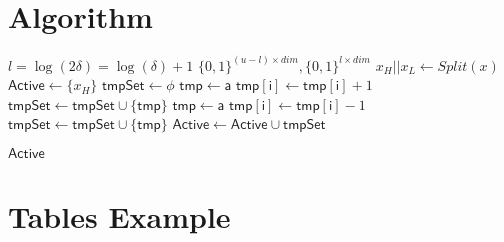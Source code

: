 \newpage
\section{Algorithm}

\label{app:alg}
\begin{algorithm}[!t]
\caption{$GenActive$}\label{alg:cap}
\begin{algorithmic}[1]
\State $l = \log(2\delta) = \log(\delta)+1$
\State \Return $\{0,1\}^{(u-l)\times dim}, \{0,1\}^{l \times dim}$
\EndProcedure
{}
\State $x_H||x_L \gets Split(x)$
\State $\mathsf{Active} \gets \{x_H\}$
\State $\mathsf{tmpSet} \gets \phi$
        \State $\mathsf{tmp} \gets \mathsf{a}$
        \State $\mathsf{tmp[i]} \gets  \mathsf{tmp[i]} +1$
        \State $\mathsf{tmpSet} \gets \mathsf{tmpSet} \cup \{\mathsf{tmp}\}$
   \EndFor
\Else 
            \State $\mathsf{tmp} \gets \mathsf{a}$
            \State $\mathsf{tmp[i]} \gets  \mathsf{tmp[i]} -1$
            \State $\mathsf{tmpSet} \gets \mathsf{tmpSet} \cup \{\mathsf{tmp}\}$
       \EndFor
\EndIf
\State $\mathsf{Active} \gets \mathsf{Active} \cup \mathsf{tmpSet}$
\EndFor

\State \Return $\mathsf{Active}$
\EndProcedure
\end{algorithmic}
\end{algorithm}


\section{Tables Example}



